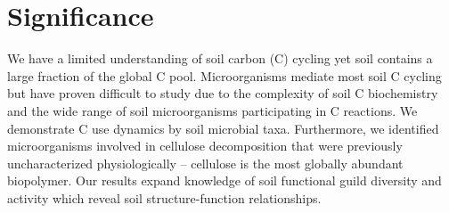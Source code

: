 \section{Significance} We have a limited understanding of soil carbon (C)
cycling yet soil contains a large fraction of the global C pool. Microorganisms
mediate most soil C cycling but have proven difficult to study due to the
complexity of soil C biochemistry and the wide range of soil microorganisms
participating in C reactions. We demonstrate C use dynamics by soil microbial
taxa. Furthermore, we identified microorganisms involved in cellulose
decomposition that were previously uncharacterized physiologically -- cellulose
is the most globally abundant biopolymer. Our results expand knowledge of soil
functional guild diversity and activity which reveal soil structure-function
relationships. 
